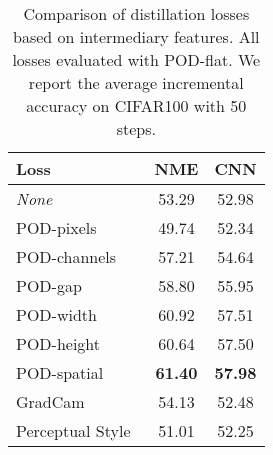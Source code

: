 \begin{table*}
    \centering
    \begin{tabular}{@{}lcc@{}}
        \toprule
        Loss                                                        & NME            & CNN            \\
        \midrule
        \textit{None}                                               & 53.29          & 52.98          \\
        POD-pixels                                                  & 49.74          & 52.34          \\
        POD-channels                                                & 57.21          & 54.64          \\
        POD-gap                                                     & 58.80          & 55.95          \\
        POD-width                                                   & 60.92          & 57.51          \\
        POD-height                                                  & 60.64          & 57.50          \\
        POD-spatial                                                 & \textbf{61.40} & \textbf{57.98} \\
        \cmidrule{1-3}
        GradCam~\citep{dhar2019learning_without_memorizing_gradcam} & 54.13          & 52.48          \\
        Perceptual Style~\citep{johnson2016perceptual_losses}       & 51.01          & 52.25          \\
        \bottomrule
    \end{tabular}
    \caption{Comparison of distillation losses based on intermediary features. All losses evaluated
        with POD-flat. We report the average incremental accuracy on CIFAR100 with 50 steps.}
    \label{tab:podnet_ablation_perceptual}
\end{table*}
